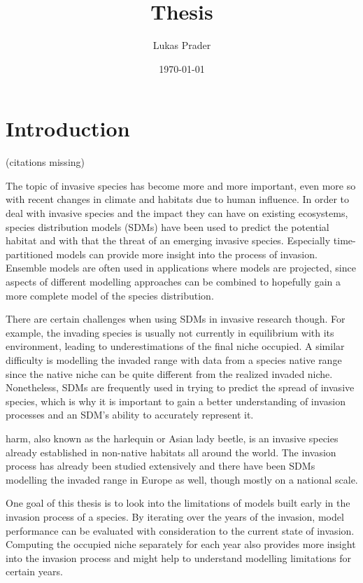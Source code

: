 \documentclass[12pt,a4paper]{article}
\begin{document}
\title{Thesis}
\author{Lukas Prader}
\date{\today}
\maketitle

\newpage
\tableofcontents
\newpage

\section{Introduction}
(citations missing)

The topic of invasive species has become more and more important, even more so with recent changes in climate and habitats due to human influence.
In order to deal with invasive species and the impact they can have on existing ecosystems, species distribution models (SDMs) have been used to predict the potential habitat and with that the threat of an emerging invasive species.
Especially time-partitioned models can provide more insight into the process of invasion. 
Ensemble models are often used in applications where models are projected, since aspects of different modelling approaches can be combined to hopefully gain a more complete model of the species distribution. 

There are certain challenges when using SDMs in invasive research though. 
For example, the invading species is usually not currently in equilibrium with its environment, leading to underestimations of the final niche occupied. 
A similar difficulty is modelling the invaded range with data from a species native range since the native niche can be quite different from the realized invaded niche.
Nonetheless, SDMs are frequently used in trying to predict the spread of invasive species, which is why it is important to gain a better understanding of invasion processes and an SDM's ability to accurately represent it.

\gls{harm}, also known as the harlequin or Asian lady beetle, is an invasive species already established in non-native habitats all around the world.
The invasion process has already been studied extensively and there have been SDMs modelling the invaded range in Europe as well, though mostly on a national scale. 

One goal of this thesis is to look into the limitations of models built early in the invasion process of a species. 
By iterating over the years of the invasion, model performance can be evaluated with consideration to the current state of invasion.
Computing the occupied niche separately for each year also provides more insight into the invasion process and might help to understand modelling limitations for certain years.
\end{document}
